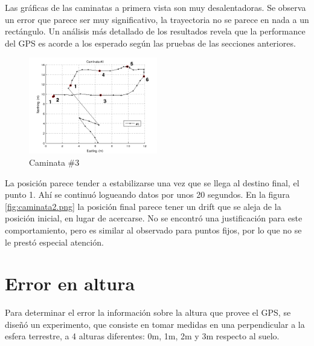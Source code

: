 \documentclass[main]{subfiles}
\begin{document}
Las gráficas de las caminatas a primera vista son muy desalentadoras. Se observa un error que parece ser muy significativo, la trayectoria no se parece en nada a un rectángulo. Un análisis más detallado de los resultados revela que la performance del GPS es acorde a los esperado según las pruebas de las secciones anteriores.

\begin{figure}
  \begin{center}
\vspace{-30pt}
    \includegraphics[width=0.5\textwidth]{./pics_gps/caminata3.png}
  \end{center}
\vspace{-20pt}
  \caption{Caminata \#3}
  \label{fig:caminata3}
\vspace{-40pt}
\end{figure}

La posición parece tender a estabilizarse una vez que se llega al destino final, el punto 1. Ahí se continuó logueando datos por unos 20 segundos. En la figura \ref{fig:caminata2.png} la posición final parece tener un drift que se aleja de la posición inicial, en lugar de acercarse. No se encontró una justificación para este comportamiento, pero es similar al observado para puntos fijos, por lo que no se le prestó especial atención.

\section{Error en altura}
\label{sec:error-en-altura}

Para determinar el error la información sobre la altura que provee el GPS, se diseñó un experimento, que consiste en tomar medidas en una perpendicular a la esfera terrestre, a 4 alturas diferentes: 0m, 1m, 2m y 3m respecto al suelo.
\end{document}
